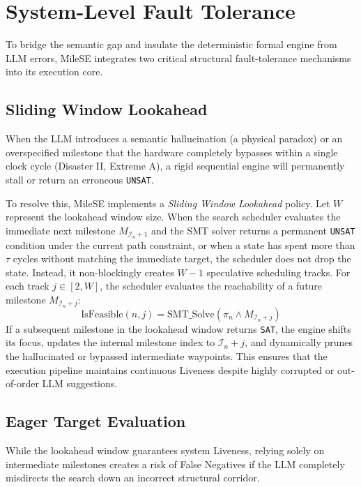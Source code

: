\documentclass[conference]{IEEEtran}
\begin{document}
\section{System-Level Fault Tolerance}
\label{sec:fault_tolerance}
To bridge the semantic gap and insulate the deterministic formal engine from LLM errors, MileSE integrates two critical structural fault-tolerance mechanisms into its execution core.

\subsection{Sliding Window Lookahead}
When the LLM introduces a semantic hallucination (a physical paradox) or an overspecified milestone that the hardware completely bypasses within a single clock cycle (Disaster II, Extreme A), a rigid sequential engine will permanently stall or return an erroneous \texttt{UNSAT}. 

To resolve this, MileSE implements a \textit{Sliding Window Lookahead} policy. Let $W$ represent the lookahead window size. When the search scheduler evaluates the immediate next milestone $M_{\mathcal{I}_n + 1}$ and the SMT solver returns a permanent \texttt{UNSAT} condition under the current path constraint, or when a state has spent more than $\tau$ cycles without matching the immediate target, the scheduler does not drop the state. Instead, it non-blockingly creates $W-1$ speculative scheduling tracks. For each track $j \in [2, W]$, the scheduler evaluates the reachability of a future milestone $M_{\mathcal{I}_n + j}$:
\begin{equation}
    \text{IsFeasible}(n, j) = \text{SMT\_Solve}\left(\pi_n \wedge M_{\mathcal{I}_n + j}\right)
\end{equation}
If a subsequent milestone in the lookahead window returns \texttt{SAT}, the engine shifts its focus, updates the internal milestone index to $\mathcal{I}_n + j$, and dynamically prunes the hallucinated or bypassed intermediate waypoints. This ensures that the execution pipeline maintains continuous Liveness despite highly corrupted or out-of-order LLM suggestions.

\subsection{Eager Target Evaluation}
While the lookahead window guarantees system Liveness, relying solely on intermediate milestones creates a risk of False Negatives if the LLM completely misdirects the search down an incorrect structural corridor. 
\end{document}
